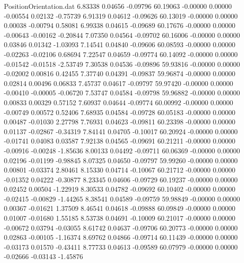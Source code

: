 \begin{filecontents}{PositionOrientation.dat}
   6.83338    0.04656   -0.09796    60.19063   -0.00000    0.00000   -0.00554    0.02132   -0.75739
   6.91319    0.04612   -0.09626    60.13019   -0.00000    0.00000    0.00038   -0.00794    0.58081
   6.99338    0.04615   -0.09689    60.17676   -0.00000    0.00000   -0.00643   -0.00162   -0.20844
   7.07350    0.04564   -0.09702    60.16006   -0.00000    0.00000    0.03846    0.01342   -1.03093
   7.14541    0.04840   -0.09606    60.08593   -0.00000    0.00000   -0.02263   -0.02106    0.68694
   7.22547    0.04659   -0.09774    60.14092   -0.00000    0.00000   -0.01542   -0.01518   -2.53749
   7.30538    0.04536   -0.09896    59.93816   -0.00000    0.00000   -0.02002    0.00816    0.42455
   7.37740    0.04391   -0.09837    59.96874   -0.00000    0.00000    0.02814    0.00496    0.06833
   7.45737    0.04617   -0.09797    59.97420   -0.00000    0.00000   -0.00410   -0.00005   -0.06720
   7.53747    0.04584   -0.09798    59.96882   -0.00000    0.00000    0.00833    0.00329    0.57152
   7.60937    0.04644   -0.09774    60.00992   -0.00000    0.00000   -0.00749    0.00572    0.52406
   7.68935    0.04584   -0.09728    60.05183   -0.00000    0.00000    0.00487   -0.01030    2.27798
   7.76931    0.04623   -0.09811    60.23398   -0.00000    0.00000    0.01137   -0.02867   -0.34319
   7.84141    0.04705   -0.10017    60.20924   -0.00000    0.00000   -0.01741    0.04083    0.03587
   7.92138    0.04565   -0.09691    60.21211   -0.00000    0.00000   -0.00916   -0.00248   -1.85636
   8.00133    0.04492   -0.09711    60.06369   -0.00000    0.00000    0.02196   -0.01199   -0.98845
   8.07325    0.04650   -0.09797    59.99260   -0.00000    0.00000    0.00801   -0.03374    2.80461
   8.15330    0.04714   -0.10067    60.21712   -0.00000    0.00000   -0.01352    0.04222   -0.30877
   8.23345    0.04606   -0.09729    60.19237   -0.00000    0.00000    0.02452    0.00504   -1.22919
   8.30533    0.04782   -0.09692    60.10402   -0.00000    0.00000   -0.02415   -0.00829   -1.44265
   8.38541    0.04589   -0.09759    59.98849   -0.00000    0.00000    0.00367   -0.01621    1.37509
   8.46541    0.04618   -0.09888    60.09849   -0.00000    0.00000    0.01007   -0.01680    1.55185
   8.53738    0.04691   -0.10009    60.21017   -0.00000    0.00000   -0.00672    0.03794   -0.03055
   8.61742    0.04637   -0.09706    60.20773   -0.00000    0.00000    0.02863   -0.00105   -1.16374
   8.69762    0.04866   -0.09714    60.11439   -0.00000    0.00000   -0.03173    0.01570   -0.43411
   8.77733    0.04613   -0.09589    60.07979   -0.00000    0.00000   -0.02666   -0.03143   -1.45876

\end{filecontents}
